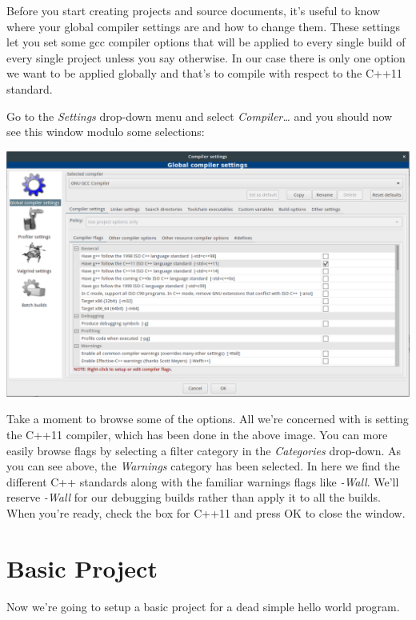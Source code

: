 \documentclass[10pt]{article}
\begin{document}
Before you start creating projects and source documents, it's useful to know where your global compiler settings are and how to change them. These settings let you set some gcc compiler options that will be applied to every single build of every single project unless you say otherwise. In our case there is only one option we want to be applied globally and that's to compile with respect to the C++11 standard.


Go to the \textit{Settings} drop-down menu and select \textit{Compiler\ldots} and you should now see this window modulo some selections:

\vspace{.1in}
\begin{center}
\includegraphics[scale=.35]{CB_GlobalCompiler.png}
\end{center}
\vspace{.1in}

Take a moment to browse some of the options. 	All we're concerned with is setting the C++11 compiler, which has been done in the above image. You can more easily browse flags by selecting a filter category in the \textit{Categories} drop-down. As you can see above, the \textit{Warnings} category has been selected. In here we find the different C++ standards along with the familiar warnings flags like \textit{-Wall}.  We'll reserve \textit{-Wall} for our debugging builds rather than apply it to all the builds. When you're ready, check the box for C++11 and press OK to close the window.

\section{Basic Project}

Now we're going to setup a basic project for a dead simple hello world program.
\end{document}
